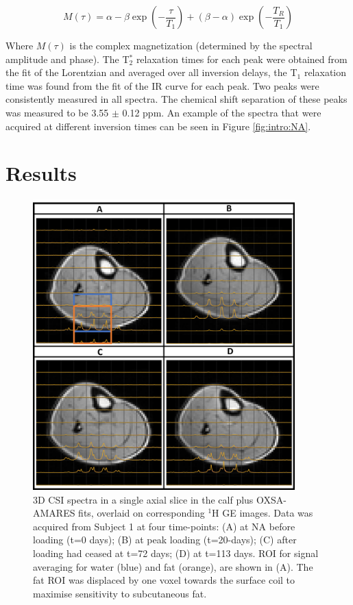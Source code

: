 \documentclass[class=article, crop=false]{standalone}
\begin{document}
\begin{equation}
    M(\tau) = \alpha - \beta\exp(-\frac{\tau}{T_1}) + (\beta - \alpha)\exp(-\frac{T_R}{T_1})
    \label{eqn:Lip:IR}
\end{equation}

Where $M(\tau)$ is the complex magnetization (determined by the spectral amplitude and phase). The T$_2^*$ relaxation times for each peak were obtained from the fit of the Lorentzian and averaged over all inversion delays, the T$_1$ relaxation time was found from the fit of the IR curve for each peak. Two peaks were consistently measured in all spectra. The chemical shift separation of these peaks was measured to be 3.55 $\pm$ 0.12 ppm. An example of the spectra that were acquired at different inversion times can be seen in Figure \ref{fig:intro:NA}.

\section{Results}

\begin{figure}
    \centering
    \includegraphics[width=0.9\textwidth]{Figures/Lipid/Calf.png}
    \caption{3D CSI spectra in a single axial slice in the calf plus OXSA-AMARES fits, overlaid on corresponding $^1$H GE images. Data was acquired from Subject 1 at four time-points: (A) at NA before loading (t=0 days); (B) at peak loading (t=20-days); (C) after loading had ceased at t=72 days; (D) at t=113 days. ROI for signal averaging for water (blue) and fat (orange), are shown in (A). The fat ROI was displaced by one voxel towards the surface coil to maximise sensitivity to subcutaneous fat.}
    \label{fig:Lip:Calf}
\end{figure}
\end{document}
